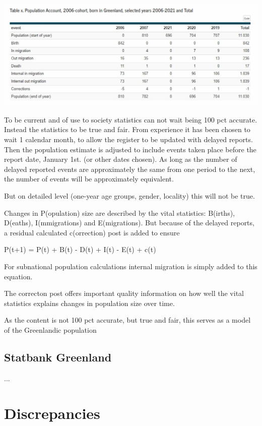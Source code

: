 \documentclass[USenglish]{article}
\begin{document}
\includegraphics[scale=0.22]{images/PopulationAccountTabX}


To be current and of use to society statistics can not wait being 100 pct accurate. Instead the statistics to be true and fair. From experience it has been chosen to wait 1 calendar month, to allow the register to be updated with delayed reports. Then the population estimate is adjusted to include events taken place before the report date, January 1st. (or other dates chosen). As long as the number of delayed reported events are approximately the same from one period to the next, the number of events will be approximately equivalent.

But on detailed level (one-year age groups, gender, locality) this will not be true.

Changes in P(opulation) size are described by the vital statistics: B(irths), D(eaths), I(mmigrations) and E(migrations). But because of the delayed reports, a residual calculated c(orrection) post is added to ensure


P(t+1) = P(t) + B(t) - D(t) + I(t) - E(t) + c(t)


For subnational population calculations internal migration is simply added to this equation.

The correcton post offers important quality information on how well the vital statistics explains changes in population size over time.

As the content is not 100 pct accurate, but true and fair, this serves as a model of the Greenlandic population


\subsection{Statbank Greenland} 
...

\section{Discrepancies}
\end{document}
